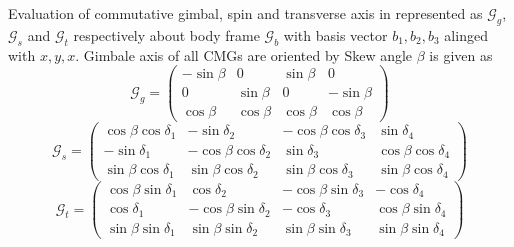 Evaluation of commutative gimbal, spin and transverse axis in represented as $\mathcal{G}_g$,$\mathcal{G}_s$ and $\mathcal{G}_t$ respectively about body frame $\mathcal{G}_b$ with basis vector ${b_1,b_2,b_3}$ alinged with ${x,y,x}$. Gimbale axis of all CMGs are oriented by Skew angle $\beta$ is given as
\begin{equation}
\mathcal{G}_g = 
\begin{pmatrix}
 -\sin{}\beta &      0 & \sin{\beta} &       0 \\
       0 & \sin{\beta} &      0 & -\sin{\beta} \\
  \cos{\beta} & \cos{\beta} & \cos{\beta} &  \cos{\beta}
\end{pmatrix}
\end{equation}
\begin{equation}
\mathcal{G}_s =
\begin{pmatrix}
\cos{\beta} \cos{\delta_1} & -\sin{\delta_2} & -\cos{\beta} \cos{\delta_3} &  \sin{\delta_4} \\
-\sin{\delta_1} & -\cos{\beta} \cos{\delta_2} &  \sin{\delta_3} &  \cos{\beta} \cos{\delta_4} \\
\sin{\beta} \cos{\delta_1} &  \sin{\beta} \cos{\delta_2} &  \sin{\beta} \cos{\delta_3} &  \sin{\beta} \cos{\delta_4} 
\end{pmatrix}
\end{equation}
\begin{equation}
\mathcal{G}_t =
\begin{pmatrix}
\cos{\beta} \sin{\delta_1} &         \cos{\delta_2} & -\cos{\beta} \sin{\delta_3} &       -\cos{\delta_4} \\
       \cos{\delta_1} & -\cos{\beta} \sin{\delta_2} &        -\cos{\delta_3} & \cos{\beta} \sin{\delta_4} \\
\sin{\beta} \sin{\delta_1} &  \sin{\beta} \sin{\delta_2} &  \sin{\beta} \sin{\delta_3} & \sin{\beta} \sin{\delta_4}
\end{pmatrix}
\end{equation}

